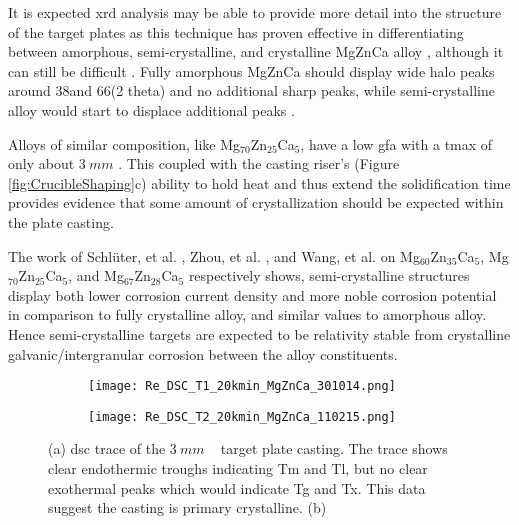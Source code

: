 \documentclass[a4paper,12pt,oneside]{report}%
\begin{document}
It is expected \gls{xrd} analysis may be able to provide more detail into the structure of the target plates as this technique has proven effective in differentiating between amorphous, semi-crystalline, and crystalline MgZnCa alloy \cite{Schluter2012, Wang2012}, although it can still be difficult \cite{Zhou2013}. Fully amorphous MgZnCa should display wide halo peaks around 38\degree and 66\degree (2 theta) and no additional sharp peaks, while semi-crystalline alloy would start to displace additional peaks \cite{Cao2013b, Gu2005, Wang2012, Gu2010, Cao2012}. 

Alloys of similar composition, like Mg$_{70}$Zn$_{25}$Ca$_{5}$, have a low \gls{gfa} with a \gls{tmax} of only about $3~ mm$ \cite{Gu2005, Zhou2013}. This coupled with the casting riser's (Figure \ref{fig:CrucibleShaping}c) ability to hold heat and thus extend the solidification time provides evidence that some amount of crystallization should be expected within the plate casting. 

The work of Schlüter, et al. \cite{Schluter2012}, Zhou, et al. \cite{Zhou2013}, and Wang, et al. \cite{Wang2012} on Mg$_{60}$Zn$_{35}$Ca$_{5}$, Mg$_{70}$Zn$_{25}$Ca$_{5}$, and Mg$_{67}$Zn$_{28}$Ca$_{5}$ respectively shows, semi-crystalline structures display both lower corrosion current density and more noble corrosion potential in comparison to fully crystalline alloy, and similar values to amorphous alloy. Hence semi-crystalline targets are expected to be relativity stable from crystalline galvanic/intergranular corrosion between the alloy constituents. 

\begin{figure}[htbp]
	\centering
	\begin{subfigure}[htbp]{0.49\textwidth}
		\texttt{[image: Re\_DSC\_T1\_20kmin\_MgZnCa\_301014.png]}
		\caption{}
		\label{fig:DSCTarget1}
	\end{subfigure}
	\begin{subfigure}[htbp]{0.49\textwidth}
		\texttt{[image: Re\_DSC\_T2\_20kmin\_MgZnCa\_110215.png]}
		\caption{}
		\label{fig:DSCTarget2}
	\end{subfigure}
	\caption{(a) \acrshort{dsc} trace of the $3~ mm$ \MgZnCa~ target plate casting. The trace shows clear endothermic troughs indicating \acrshort{Tm} and \acrshort{Tl}, but no clear exothermal peaks which would indicate \acrshort{Tg} and \acrshort{Tx}. This data suggest the casting is primary crystalline. (b)}%
	\label{fig:DSCTarget1n2}
\end{figure}
\end{document}
